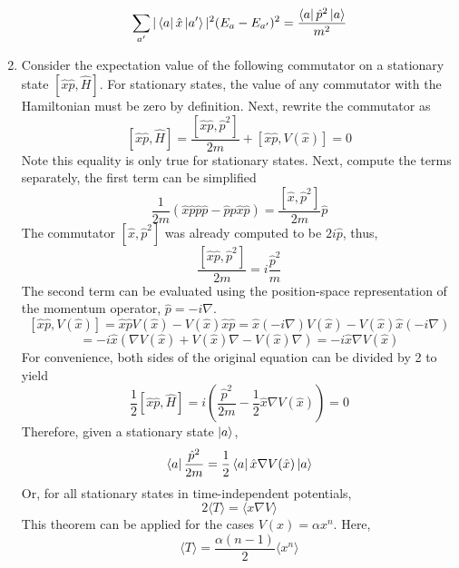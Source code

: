 \begin{sol}
\begin{enumerate}[label=\textbf{(\alph*)}]
$$\sum_{a'}|\bra a\hat x\ket{a'}|^2(E_a-E_{a'})^2=\frac{\bra a\hat p^2\ket a}{m^2}$$
\item
Consider the expectation value of the following commutator on a stationary state $[\hat x\hat p,\hat H]$. For stationary states, the value of any commutator with the Hamiltonian must be zero by definition. Next, rewrite the commutator as
$$[\hat x\hat p, \hat H]=\frac{[\hat x\hat p,\hat p^2]}{2m}+[\hat x\hat p,V(\hat x)]=0$$
Note this equality is only true for stationary states. Next, compute the terms separately, the first term can be simplified
$$\frac{1}{2m}(\hat x\hat p\hat p\hat p-\hat p\hat p\hat x\hat p)=\frac{[\hat x,\hat p^2]}{2m}\hat p$$ 
The commutator $[\hat x,\hat p^2]$ was already computed to be $2i\hat p$, thus,
$$\frac{[\hat x\hat p,\hat p^2]}{2m}=i\frac{\hat p^2}{m}$$
The second term can be evaluated using the position-space representation of the momentum operator, $\hat p=-i\nabla$. 
$$[\hat x\hat p,V(\hat x)]=\hat x\hat p V(\hat x)-V(\hat x)\hat x\hat p=\hat x(-i\nabla)V(\hat x)-V(\hat x)\hat x(-i\nabla)$$
$$=-i\hat x(\nabla V(\hat x)+V(\hat x)\nabla-V(\hat x)\nabla)=-i\hat x\nabla V(\hat x)$$
For convenience, both sides of the original equation can be divided by 2 to yield
$$\frac{1}{2}[\hat x\hat p, \hat H]=i\left(\frac{\hat p^2}{2m}-\frac{1}{2}\hat x\nabla V(\hat x)\right)=0$$
Therefore, given a stationary state $\ket a$,
$$\bra a\frac{\hat p^2}{2m}=\frac{1}{2}\bra a\hat x\nabla V(\hat x)\ket a$$
Or, for all stationary states in time-independent potentials,
$$2\langle T\rangle=\langle x\nabla V\rangle$$ 
This theorem can be applied for the cases $V(x)=\alpha x^n$. Here,
$$\langle T\rangle=\frac{\alpha(n-1)}{2}\langle x^n\rangle$$ 
\end{enumerate}
\end{sol}